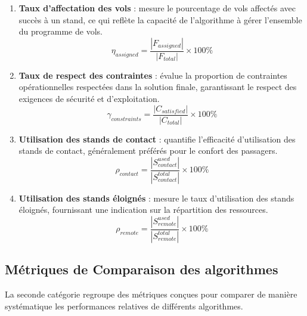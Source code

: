 \begin{enumerate}
	\item \textbf{Taux d’affectation des vols} : mesure le pourcentage de vols affectés avec succès à un stand, ce qui reflète la capacité de l’algorithme à gérer l’ensemble du programme de vols.
	\vspace{-1em}
	\begin{equation}
		\eta_{assigned} = \frac{|F_{assigned}|}{|F_{total}|} \times 100\%
	\end{equation}
	\vspace{-1em}
	\item \textbf{Taux de respect des contraintes} : évalue la proportion de contraintes opérationnelles respectées dans la solution finale, garantissant le respect des exigences de sécurité et d’exploitation.
	\vspace{-1em}
	\begin{equation}
		\gamma_{constraints} = \frac{|C_{satisfied}|}{|C_{total}|} \times 100\%
	\end{equation}
	
	\item \textbf{Utilisation des stands de contact} : quantifie l’efficacité d’utilisation des stands de contact, généralement préférés pour le confort des passagers.
	\vspace{-1em}
	\begin{equation}
		\rho_{contact} = \frac{|S_{contact}^{used}|}{|S_{contact}^{total}|} \times 100\%
	\end{equation}
	
	\item \textbf{Utilisation des stands éloignés} : mesure le taux d’utilisation des stands éloignés, fournissant une indication sur la répartition des ressources.
	\vspace{-0.7em}
	\begin{equation}
		\rho_{remote} = \frac{|S_{remote}^{used}|}{|S_{remote}^{total}|} \times 100\%
	\end{equation}
\end{enumerate}

\subsection{Métriques de Comparaison des algorithmes}

La seconde catégorie regroupe des métriques conçues pour comparer de manière systématique les performances relatives de différents algorithmes.

